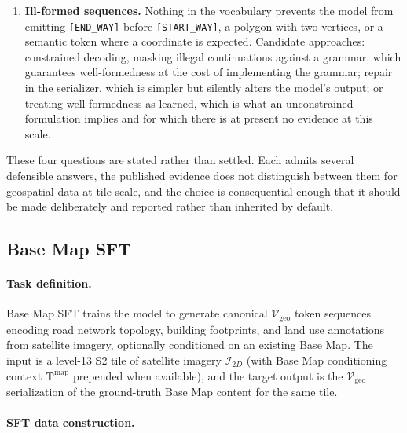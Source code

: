 \documentclass{book}
\begin{document}
\begin{enumerate}
\item \textbf{Ill-formed sequences.}  Nothing in the vocabulary
  prevents the model from emitting \texttt{[END\_WAY]} before
  \texttt{[START\_WAY]}, a polygon with two vertices, or a
  semantic token where a coordinate is expected.  Candidate
  approaches: constrained decoding, masking illegal
  continuations against a grammar, which guarantees
  well-formedness at the cost of implementing the grammar;
  repair in the serializer, which is simpler but silently alters
  the model's output; or treating well-formedness as learned,
  which is what an unconstrained formulation implies and for
  which there is at present no evidence at this scale.
\end{enumerate}

These four questions are stated rather than settled.  Each admits
several defensible answers, the published evidence does not
distinguish between them for geospatial data at tile scale, and
the choice is consequential enough that it should be made
deliberately and reported rather than inherited by default.

\subsection{Base Map SFT}
\label{sec:basemap_sft}

\paragraph{Task definition.}

Base Map SFT trains the model to generate canonical
$\mathcal{V}_{\text{geo}}$ token sequences encoding road
network topology, building footprints, and land use
annotations from satellite imagery, optionally conditioned
on an existing Base Map.  The input is a level-13 S2 tile
of satellite imagery $\mathcal{I}_{2D}$ (with Base Map
conditioning context $\mathbf{T}^{\text{map}}$ prepended
when available), and the target output is the
$\mathcal{V}_{\text{geo}}$ serialization of the ground-truth
Base Map content for the same tile.

\paragraph{SFT data construction.}
\end{document}
